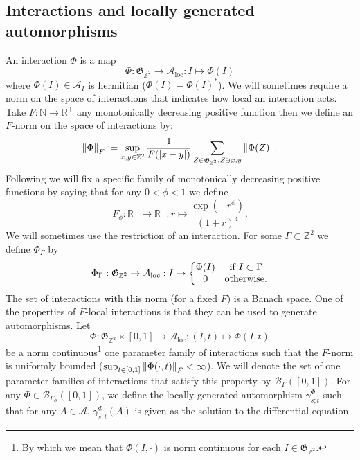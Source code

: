\documentclass[12pt,a4paper,twoside]{article}
\newcommand{\defeq}{\vcentcolon=}
\let\originalleft\left
\let\originalright\right
\renewcommand{\left}{\mathopen{}\mathclose\bgroup\originalleft}
\renewcommand{\right}{\aftergroup\egroup\originalright}
\newcommand{\BB}{\mathcal B}
\newcommand{\ZZ}{\mathbb Z}
\renewcommand{\AA}{\mathcal A}
\newcommand{\RR}{\mathbb R}
\newcommand{\NN}{\mathbb{N}}
\theoremstyle{definition}
\numberwithin{equation}{section}
\begin{document}
\subsection{Interactions and locally generated automorphisms}\label{sec:Interactions}
An interaction $\Phi$ is a map
\begin{equation}
	\Phi: \mathfrak{G}_{\ZZ^2}\rightarrow \AA_{\text{loc}}: I \mapsto \Phi(I)
\end{equation}
where $\Phi(I)\in\AA_I$ is hermitian ($\Phi(I)=\Phi(I)^*$). We will sometimes require a norm on the space of interactions that indicates how local an interaction acts. Take $F:\NN\rightarrow \RR^+$ any monotonically decreasing positive function then we define an $F$-norm on the space of interactions by:
\begin{equation}
	\norm{\Phi}_F\defeq \sup_{x,y\in\ZZ^2}\frac{1}{F(\abs{x-y})}\sum_{Z\in\mathfrak{G}_{\ZZ^2},Z\ni x,y}\norm{\Phi(Z)}.
\end{equation}
Following \cite{ogata2021h3gmathbb} we will fix a specific family of monotonically decreasing positive functions by saying that for any $0<\phi<1$ we define
\begin{equation}\label{eq:OurFFunction}
	F_\phi:\RR^+\rightarrow\RR^+:r\mapsto \frac{\exp(-r^\phi)}{(1+r)^4}.
\end{equation}
We will sometimes use the restriction of an interaction. For some $\Gamma\subset\ZZ^2$ we define $\Phi_\Gamma$ by
\begin{equation}
	\Phi_\Gamma:\mathfrak{G}_{\ZZ^2}\rightarrow \AA_{\text{loc}}:I\mapsto\left\{\begin{matrix}
		\Phi(I)&\text{if }I\subset\Gamma\\0&\text{otherwise}.
	\end{matrix}\right.
\end{equation}
The set of interactions with this norm (for a fixed $F$) is a Banach space. One of the properties of $F$-local interactions is that they can be used to generate automorphisms. Let
\begin{equation}
	\Phi:\mathfrak{G}_{\ZZ^2}\times [0,1]\rightarrow \AA_{\text{loc}}:(I,t)\mapsto \Phi(I,t)
\end{equation}
be a norm continuous\footnote{By which we mean that $\Phi(I,\cdot)$ is norm continuous for each $I\in\mathfrak{G}_{\ZZ^2}$.} one parameter family of interactions such that the $F$-norm is uniformly bounded ($\sup_{t\in[0,1]}\norm{\Phi(\cdot,t)}_F<\infty$). We will denote the set of one parameter families of interactions that satisfy this property by $\BB_{F}([0,1])$. For any $\Phi\in\BB_{F_\phi}([0,1])$, we define the locally generated automorphism $\gamma^{\Phi}_{s;t}$ such that for any $A\in\AA$, $\gamma^{\Phi}_{s;t}(A)$ is given as the solution to the differential equation
\end{document}
